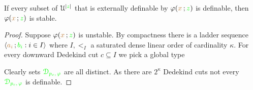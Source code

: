 \documentclass[creche.tex]{subfiles}
\begin{document}
\begin{theorem}\label{thm_def_stable_formula2}
If every subset of $\EuScript U^{|{\color{green} z}|}$ that is externally definable by $\varphi({\color{brown} x}\,;{\color{green} z})$ is definable, then $\varphi({\color{brown} x}\,;{\color{green} z})$ is stable.
\end{theorem}

\begin{proof}
Suppose  $\varphi({\color{brown} x}\,;{\color{green} z})$ is unstable. By compactness there is a ladder sequence  $\langle{\color{brown}a_i}\,;{\color{green} b_i} : i\in I\rangle$ where $I,<_I$ a saturated dense linear order of cardinality $\kappa$. For every downward Dedekind cut $c\subseteq I$ we pick a global type


Clearly sets ${\color{green}\EuScript D_{p_c,\,\varphi} }$ are all distinct. As there are $2^\kappa$ Dedekind cuts not every ${\color{green}\EuScript D_{p_c,\,\varphi} }$ is definable.
\end{proof}
\end{document}
